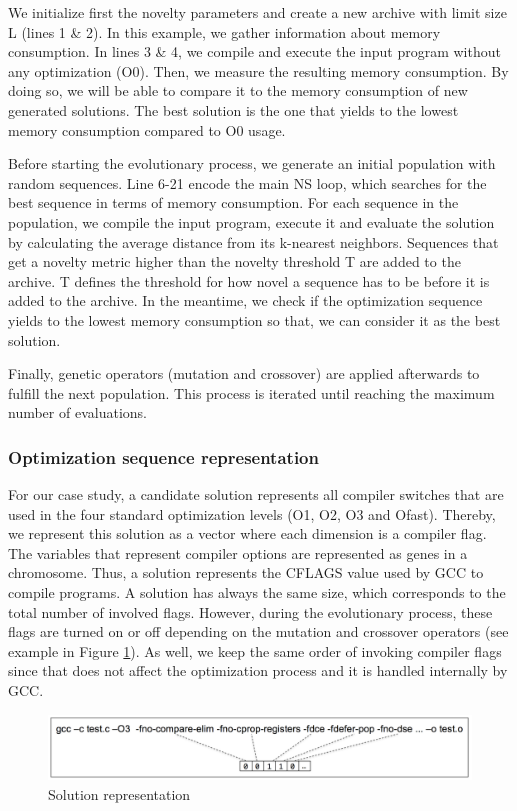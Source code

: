 We initialize first the novelty parameters and create a new archive with limit size L (lines 1 \& 2). In this example, we gather information about memory consumption. In lines 3 \& 4, we compile and execute the input program without any optimization (O0). Then, we measure the resulting memory consumption. By doing so, we will be able to compare it to the memory consumption of new generated solutions. The best solution is the one that yields to the lowest memory consumption compared to O0 usage.

Before starting the evolutionary process, we generate an initial population with random sequences. Line 6-21 encode the main NS loop, which searches for the best sequence in terms of memory consumption. For each sequence in the population, we compile the input program, execute it and evaluate the solution by calculating the average distance from its k-nearest neighbors. Sequences that get a novelty metric higher than the novelty threshold T are added to the archive. T defines the threshold for how novel a sequence has to be before it is added to the archive. In the meantime, we check if the optimization sequence yields to the lowest memory consumption so that, we can consider it as the best solution. 

Finally, genetic operators (mutation and crossover) are applied afterwards to fulfill the next population. This process is iterated until reaching the maximum number of evaluations.


\subsubsection{Optimization sequence representation}
For our case study, a candidate solution represents all compiler switches that are used in the four standard optimization levels (O1, O2, O3 and Ofast). Thereby, we represent this solution as a vector where each dimension is a compiler flag. 
The variables that represent compiler options are represented as genes in a chromosome. 
Thus, a solution represents the CFLAGS value used by GCC to compile programs.
A solution has always the same size, which corresponds to the total number of involved flags. 
However, during the evolutionary process, these flags are turned on or off depending on the mutation and crossover operators (see example in Figure \ref{fig:individual.pdf}). As well, we keep the same order of invoking compiler flags since that does not affect the optimization process and it is handled internally by GCC.

\begin{figure}[h]
	\centering
	\includegraphics[width=1\hsize]{chapitre3/fig/individual.png}
	\caption{Solution representation}
	\label{fig:individual.pdf}
\end{figure}

